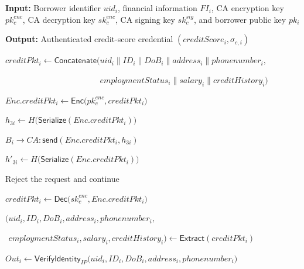 \documentclass[a4paper,fleqn]{cas-dc}
\begin{document}
\begin{algorithm*}[t]
\caption{Credit-Score Credential Issuance}
\label{alg:credit_score}
\small

\textbf{Input:}
Borrower identifier $uid_i$, financial information $FI_i$,
CA encryption key $pk_c^{enc}$, CA decryption key $sk_c^{enc}$,
CA signing key $sk_c^{sig}$, and borrower public key $pk_i$

\textbf{Output:}
Authenticated credit-score credential
$(creditScore_i,\sigma_{c,i})$

\begin{algorithmic}[1]


    \State $creditPkt_i \leftarrow
    \mathsf{Concatenate}\bigl(
    uid_i \parallel ID_i \parallel DoB_i
    \parallel address_i \parallel phonenumber_i,$

    \Statex \hspace{\algorithmicindent}
    $\phantom{creditPkt_i \leftarrow
    \mathsf{Concatenate}\bigl(}
    employmentStatus_i
    \parallel salary_i
    \parallel creditHistory_i
    \bigr)$

    \State $Enc.creditPkt_i
    \leftarrow
    \mathsf{Enc}
    \bigl(pk_c^{enc},creditPkt_i\bigr)$

    \State $h_{3i}
    \leftarrow
    H\bigl(
    \mathsf{Serialize}(Enc.creditPkt_i)
    \bigr)$

    \State $B_i\rightarrow CA:
    \mathsf{send}(Enc.creditPkt_i,h_{3i})$

\EndFor


    \State $h'_{3i}
    \leftarrow
    H\bigl(
    \mathsf{Serialize}(Enc.creditPkt_i)
    \bigr)$

        \State Reject the request and continue
    \EndIf

    \State $creditPkt_i
    \leftarrow
    \mathsf{Dec}
    \bigl(sk_c^{enc},Enc.creditPkt_i\bigr)$

    \State $(uid_i,ID_i,DoB_i,address_i,phonenumber_i,$

    \Statex \hspace{\algorithmicindent}
    $\phantom{(}
    employmentStatus_i,salary_i,creditHistory_i)
    \leftarrow
    \mathsf{Extract}(creditPkt_i)$

    \State $Out_i
    \leftarrow
    \mathsf{VerifyIdentity}_{IP}
    \bigl(
    uid_i,ID_i,DoB_i,address_i,phonenumber_i
    \bigr)$


\end{algorithmic}
\end{algorithm*}
\end{document}
